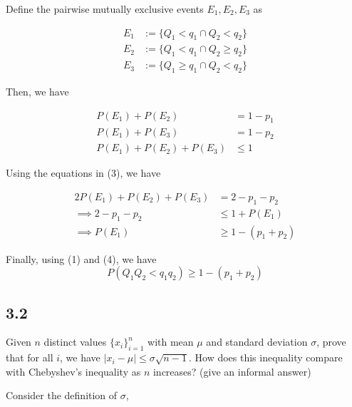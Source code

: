\documentclass{article}
\begin{document}
Define the pairwise mutually exclusive events $E_1, E_2, E_3$ as

\begin{equation}
\begin{aligned}
    E_1 &:= \{Q_1 < q_1 \cap Q_2 < q_2\} \\
    E_2 &:= \{Q_1 < q_1 \cap Q_2 \ge q_2\} \\
    E_3 &:= \{Q_1 \ge q_1 \cap Q_2 < q_2\}
\end{aligned}
\end{equation}

Then, we have

\begin{equation}
\begin{aligned}
    P(E_1) + P(E_2)  &= 1-p_1 \\
    P(E_1) + P(E_3)  &= 1-p_2 \\
    P(E_1) + P(E_2) + P(E_3) &\le 1
\end{aligned}
\end{equation}

Using the equations in (3), we have

\begin{equation}
\begin{aligned}
    2P(E_1) + P(E_2) + P(E_3) &= 2 - p_1 - p_2 \\
    \implies 2 - p_1 - p_2 &\le 1 + P(E_1) \\
    \implies P(E_1) &\ge 1 - (p_1 + p_2)
\end{aligned}
\end{equation}

Finally, using (1) and (4), we have
\begin{equation}
    P(Q_1Q_2<q_1q_2) \ge 1-(p_1+p_2)
\end{equation}

\setcounter{equation}{0}

\subsection*{3.2}
\begin{tcolorbox}
    Given $n$ distinct values $\{x_i\}^n_{i=1}$ with mean $\mu$ and standard deviation $\sigma$, prove
    that for all $i$, we have $|x_i - \mu| \le \sigma \sqrt{n - 1}$. How does this inequality compare
    with Chebyshev’s inequality as $n$ increases? (give an informal answer) 
\end{tcolorbox}

Consider the definition of $\sigma$,
\end{document}
